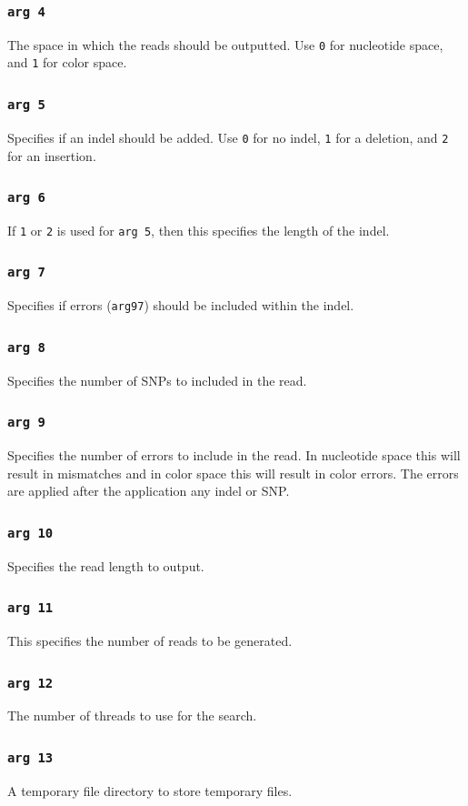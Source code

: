 \documentclass[a4paper,12pt]{book}
\newcommand{\TT}[1]{{\tt #1}} %
\begin{document}
\subsubsection{\TT{arg 4}}
The space in which the reads should be outputted.
Use \TT{0} for nucleotide space, and \TT{1} for color space.
\subsubsection{\TT{arg 5}}
Specifies if an indel should be added.
Use \TT{0} for no indel, \TT{1} for a deletion, and \TT{2} for an insertion.
\subsubsection{\TT{arg 6}}
If \TT{1} or \TT{2} is used for \TT{arg 5}, then this specifies the length of the indel.
\subsubsection{\TT{arg 7}}
Specifies if errors (\TT{arg97}) should be included within the indel. 
\subsubsection{\TT{arg 8}}
Specifies the number of SNPs to included in the read.
\subsubsection{\TT{arg 9}}
Specifies the number of errors to include in the read.
In nucleotide space this will result in mismatches and in color space this will result in color errors.
The errors are applied after the application any indel or SNP.
\subsubsection{\TT{arg 10}}
Specifies the read length to output.
\subsubsection{\TT{arg 11}}
This specifies the number of reads to be generated.
\subsubsection{\TT{arg 12}}
The number of threads to use for the search.
\subsubsection{\TT{arg 13}}
A temporary file directory to store temporary files.
\end{document}
